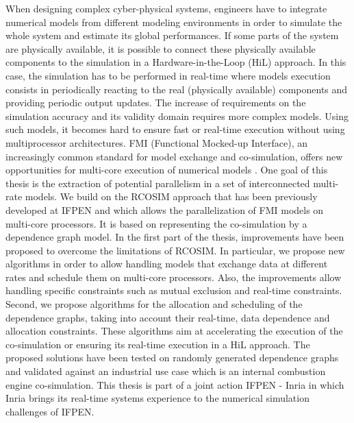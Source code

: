 When designing complex cyber-physical systems, engineers have to integrate numerical models
from different
modeling environments in order to simulate the whole system and estimate its global
performances. If some parts of the system are physically available, it is possible to connect these
physically available components to the simulation in a Hardware-in-the-Loop (HiL) approach. In this case, the
simulation has to be performed in real-time where models execution consists in periodically
reacting to the real (physically available) components and providing periodic output updates. The
increase of requirements on the simulation accuracy and its validity domain requires more
complex models. Using such models, it becomes hard to ensure fast or real-time execution without using
multiprocessor architectures. FMI (Functional Mocked-up Interface), an increasingly common
standard for model exchange and co-simulation, offers
new opportunities for multi-core execution
of numerical models%
. One goal of this thesis is the extraction of potential parallelism in a set of interconnected multi-rate models. We build on the RCOSIM approach that has been previously developed at IFPEN and which allows the parallelization of FMI models on multi-core processors. It is based on representing the co-simulation by a dependence graph model. In the first part of the thesis, improvements have been proposed to overcome the limitations of RCOSIM. In particular, we propose new algorithms in order to allow
handling models that exchange data at different
rates and schedule them on multi-core processors. Also, the improvements allow handling specific constraints such as mutual exclusion and real-time constraints. 
Second, we propose algorithms for the allocation and scheduling of the dependence graphs, taking %
into account their real-time, data dependence and allocation constraints. These algorithms aim at accelerating the execution of the co-simulation or ensuring its real-time execution in a HiL approach.
The proposed solutions have been tested on randomly generated dependence graphs and validated against an industrial use case which is an internal combustion engine co-simulation.
This thesis is part of a joint action IFPEN - Inria in which Inria brings its real-time systems experience to the numerical simulation challenges of IFPEN.